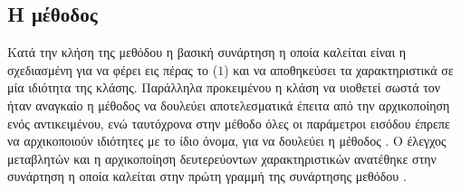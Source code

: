 \subsection{Η μέθοδος \texttt{}}
Κατά την κλήση της μεθόδου \texttt{} η βασική συνάρτηση η οποία καλείται είναι η \texttt{} σχεδιασμένη για να φέρει εις πέρας το ($1$) και να αποθηκεύσει τα χαρακτηριστικά σε μία ιδιότητα της κλάσης.
Παράλληλα προκειμένου η κλάση  να υιοθετεί σωστά τον  ήταν αναγκαίο η μέθοδος  να δουλεύει αποτελεσματικά έπειτα από την αρχικοποίηση ενός αντικειμένου, ενώ ταυτόχρονα στην μέθοδο   όλες οι παράμετροι εισόδου έπρεπε να αρχικοποιούν ιδιότητες με το ίδιο όνομα, για να δουλεύει η μέθοδος .
Ο έλεγχος μεταβλητών και η αρχικοποίηση δευτερεύοντων χαρακτηριστικών ανατέθηκε στην συνάρτηση \texttt{} η οποία καλείται στην πρώτη γραμμή της συνάρτησης μεθόδου \texttt{}.

